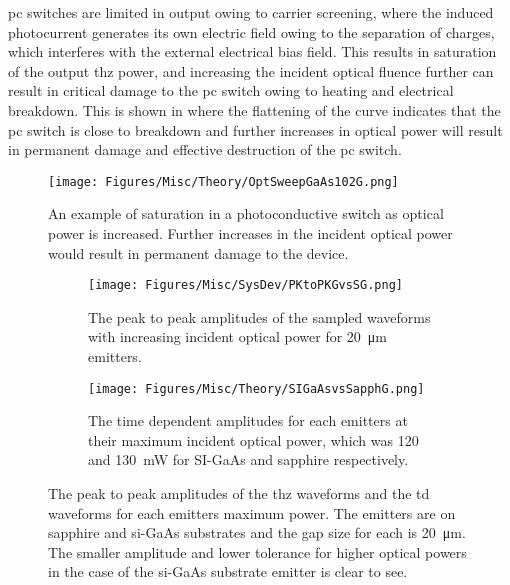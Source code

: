 \acrshort{pc} switches are limited in output owing to carrier screening, where the induced photocurrent generates its own electric field owing to the separation of charges, which interferes with the external electrical bias field. This results in saturation of the output \acrshort{thz} power, and increasing the incident optical fluence further can result in critical damage to the \acrshort{pc} switch \DIFdelbegin \DIFdel{~}\DIFdelend \cite{Kim2005} owing to heating and electrical breakdown. This is shown in  where the flattening of the curve indicates that the \acrshort{pc} switch is close to breakdown and further increases in optical power will result in permanent damage and effective destruction of the \acrshort{pc} switch.

\begin{figure}
    \centering
    \texttt{[image: Figures/Misc/Theory/OptSweepGaAs102G.png]}
    \captionsetup{font = footnotesize, justification = centering}
    \caption[An Example of Saturation in a Photoconductive Switch]{An example of saturation in a photoconductive switch as optical power is increased. Further increases in the incident optical power would result in permanent damage to the device.}
    \label{fig:saturation}
\end{figure}

\begin{figure}
\begin{subfigure}{1\textwidth}
    \centering
    \texttt{[image: Figures/Misc/SysDev/PKtoPKGvsSG.png]}
    \caption{The peak to peak amplitudes of the sampled waveforms with increasing incident optical power for \SI{20}{\micro\metre} emitters.}
    \label{fig:sapphGaAspkpk}
    \vspace{10 mm}
\end{subfigure}
\vspace{10 mm}
\begin{subfigure}{1\textwidth}
    \centering
    \texttt{[image: Figures/Misc/Theory/SIGaAsvsSapphG.png]}
    \caption{The time dependent amplitudes for each emitters at their maximum incident optical power, which was 120 and \SI{130}{mW} for SI\nobreakdash-GaAs and sapphire respectively.}
    \label{fig:saphGaAsTD}
\end{subfigure}
\captionsetup{font = footnotesize, justification = centering}
\caption[The Peak to Peak Amplitudes of the Terahertz Waveforms and the Time-Domain Waveforms for each Emitters Maximum Power]{The peak to peak amplitudes of the \acrshort{thz} waveforms and the \acrshort{td} waveforms for each emitters maximum power. The emitters are on sapphire and \acrshort{si}-GaAs substrates and the gap size for each is \SI{20}{\micro\metre}. The smaller amplitude and lower tolerance for higher optical powers in the case of the  \acrshort{si}-GaAs substrate emitter is clear to see.}
\label{fig:gaasvssapph}
\end{figure}

